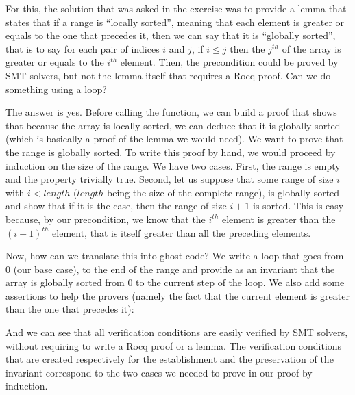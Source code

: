 


For this, the solution that was asked in the exercise was to provide a lemma
that states that if a range is ``locally sorted'', meaning that each element
is greater or equals to the one that precedes it, then we can say that it is
``globally sorted'', that is to say for each pair of indices $i$ and $j$, if
$i \leq j$ then the $j^{th}$ of the array is greater or equals to the $i^{th}$
element. Then, the precondition could be proved by SMT solvers, but not the
lemma itself that requires a Rocq proof. Can we do something using a loop?



The answer is yes. Before calling the function, we can build a proof that
shows that because the array is locally sorted, we can deduce that it is
globally sorted (which is basically a proof of the lemma we would need).
We want to prove that the range is globally sorted. To write this proof by hand,
we would proceed by induction on the size of the range. We have two cases.
First, the range is empty and the property trivially true. Second, let us suppose
that some range of size $i$ with $i < length$ ($length$ being the size of the
complete range), is globally sorted and show that if it is the case, then the
range of size $i+1$ is sorted. This is easy because, by our precondition, we
know that the $i^{th}$ element is greater than the $(i-1)^{th}$ element, that is
itself greater than all the preceding elements.




Now, how can we translate this into ghost code? We write a loop that goes from
$0$ (our base case), to the end of the range  and provide as an
invariant that the array is globally sorted from $0$ to the current step of the
loop. We also add some assertions to help the provers (namely the fact that the
current element is greater than the one that precedes it):






And we can see that all verification conditions are easily verified by SMT
solvers, without requiring to write a Rocq proof or a lemma. The verification
conditions that are created respectively for the establishment and the preservation
of the invariant correspond to the two cases we needed to prove in our proof
by induction.


